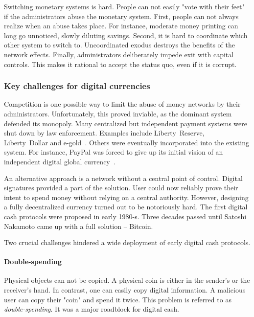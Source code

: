 Switching monetary systems is hard.
People can not easily "vote with their feet" if the administrators abuse the monetary system.
First, people can not always realize when an abuse takes place.
For instance, moderate money printing can long go unnoticed, slowly diluting savings.
Second, it is hard to coordinate which other system to switch to.
Uncoordinated exodus destroys the benefits of the network effects.
Finally, administrators deliberately impede exit with capital controls.
This makes it rational to accept the status quo, even if it is corrupt.


\subsubsection*{Key challenges for digital currencies}

Competition is one possible way to limit the abuse of money networks by their administrators.
Unfortunately, this proved inviable, as the dominant system defended its monopoly.
Many centralized but independent payment systems were shut down by law enforcement.
Examples include Liberty~Reserve, Liberty~Dollar and e-gold~\cite{White2014, Trautman2014}.
Others were eventually incorporated into the existing system.
For instance, PayPal was forced to give up its initial vision of an independent digital global currency~\cite{Jackson2017}.

An alternative approach is a network without a central point of control.
Digital signatures provided a part of the solution.
User could now reliably prove their intent to spend money without relying on a central authority.
However, designing a fully decentralized currency turned out to be notoriously hard.
The first digital cash protocols were proposed in early 1980-s.
Three decades passed until Satoshi Nakamoto came up with a full solution -- Bitcoin.

Two crucial challenges hindered a wide deployment of early digital cash protocols.

\paragraph{Double-spending}

Physical objects can not be copied.
A physical coin is either in the sender's or the receiver's hand.
In contrast, one can easily copy digital information.
A malicious user can copy their "coin" and spend it twice.
This problem is referred to as \textit{double-spending}.
It was a major roadblock for digital cash.

